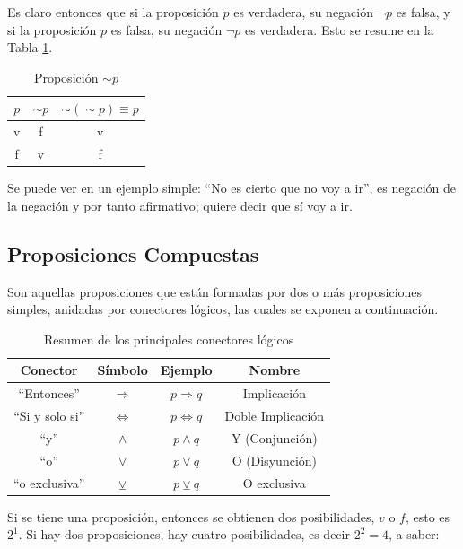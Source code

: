 Es claro entonces que si la proposición $p$ es verdadera, su negación $\lnot p$ es falsa, y si la proposición $p$ es falsa, su negación $\lnot p$ es verdadera. Esto se resume en la Tabla \ref{tabla:nop}.

\begin{table}[ht]
\caption{Proposición $\sim p$}\label{tabla:nop}
\centering
\begin{tabular}{|c|c|c|}
\hline
$p$ & $ \sim p$ & $\sim (\sim p )\equiv p$\\ \hline
v & f  & v\\ \hline
f & v  & f\\ \hline
\end{tabular}
\end{table}

Se puede ver en un ejemplo simple: ``No es cierto que no voy a ir'', es negación de la negación y por tanto afirmativo; quiere decir que sí voy a ir.

\subsection{Proposiciones Compuestas}

Son aquellas proposiciones que están formadas por dos o más proposiciones simples, anidadas por conectores lógicos, las cuales se exponen a continuación.

\begin{table}[ht]
\caption{Resumen de los principales conectores lógicos}\label{tabla_conector}
\centering
\begin{tabular}{|c|c|c|c|}
\hline
Conector        & Símbolo        & Ejemplo         & Nombre    \\ \hline
``Entonces'' & $\Rightarrow$     & $p \Rightarrow q$ & Implicación  \\ \hline
``Si y solo si''  & $\Leftrightarrow$ & $p \Leftrightarrow q$ & Doble Implicación \\ \hline
``y''            & $\land$           & $p \land q$    & Y (Conjunción)    \\ \hline
``o''             & $\lor$            & $p \lor q$ & O (Disyunción)         \\ \hline
``o exclusiva'' & $\veebar$ & $p\veebar q$ & O exclusiva \\ \hline
\end{tabular}
\end{table}

Si se tiene una proposición, entonces se obtienen dos posibilidades, $v$ o $f$, esto es $2^1$. Si hay dos proposiciones, hay cuatro posibilidades, es decir $2^2=4$, a saber:

